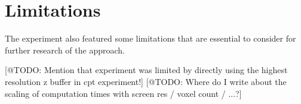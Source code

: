










\section{Limitations}

The experiment also featured some limitations that are essential to consider for further research of the approach.



[@TODO: Mention that experiment was limited by directly using the highest resolution z buffer in cpt experiment!]
[@TODO: Where do I write about the scaling of computation times with screen res / voxel count / ...?]





